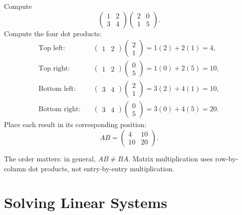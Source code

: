\documentclass[10pt,letterpaper]{article}
\begin{document}
\begin{example}[5]{
Compute
\[
\begin{pmatrix}
1&2\\
3&4
\end{pmatrix}
\begin{pmatrix}
2&0\\
1&5
\end{pmatrix}.
\]
}
Compute the four dot products:
\begin{align*}
\text{Top left:}\quad
&\begin{pmatrix}1&2\end{pmatrix}
\begin{pmatrix}2\\1\end{pmatrix}=1(2)+2(1)=4,\\
\text{Top right:}\quad
&\begin{pmatrix}1&2\end{pmatrix}
\begin{pmatrix}0\\5\end{pmatrix}=1(0)+2(5)=10,\\
\text{Bottom left:}\quad
&\begin{pmatrix}3&4\end{pmatrix}
\begin{pmatrix}2\\1\end{pmatrix}=3(2)+4(1)=10,\\
\text{Bottom right:}\quad
&\begin{pmatrix}3&4\end{pmatrix}
\begin{pmatrix}0\\5\end{pmatrix}=3(0)+4(5)=20.
\end{align*}
Place each result in its corresponding position:
\[
\boxed{
AB=
\begin{pmatrix}
4&10\\
10&20
\end{pmatrix}.
}
\]
\end{example}

The order matters: in general, $AB\ne BA$.
Matrix multiplication uses row-by-column dot products,
not entry-by-entry multiplication.

\section{Solving Linear Systems}
\end{document}
